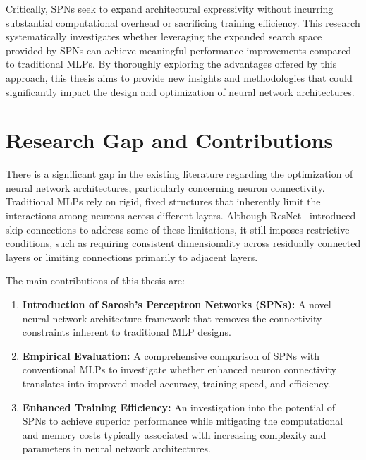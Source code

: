 Critically, SPNs seek to expand architectural expressivity without incurring substantial computational overhead or sacrificing training efficiency. This research systematically investigates whether leveraging the expanded search space provided by SPNs can achieve meaningful performance improvements compared to traditional MLPs. By thoroughly exploring the advantages offered by this approach, this thesis aims to provide new insights and methodologies that could significantly impact the design and optimization of neural network architectures.


\section{Research Gap and Contributions}

There is a significant gap in the existing literature regarding the optimization of neural network architectures, particularly concerning neuron connectivity. Traditional MLPs rely on rigid, fixed structures that inherently limit the interactions among neurons across different layers. Although ResNet~\cite{he2016deep} introduced skip connections to address some of these limitations, it still imposes restrictive conditions, such as requiring consistent dimensionality across residually connected layers or limiting connections primarily to adjacent layers.

The main contributions of this thesis are:
\begin{enumerate}
\item \textbf{Introduction of Sarosh's Perceptron Networks (SPNs):} A novel neural network architecture framework that removes the connectivity constraints inherent to traditional MLP designs.
\item \textbf{Empirical Evaluation:} A comprehensive comparison of SPNs with conventional MLPs to investigate whether enhanced neuron connectivity translates into improved model accuracy, training speed, and efficiency.
\item \textbf{Enhanced Training Efficiency:} An investigation into the potential of SPNs to achieve superior performance while mitigating the computational and memory costs typically associated with increasing complexity and parameters in neural network architectures.
\end{enumerate}


